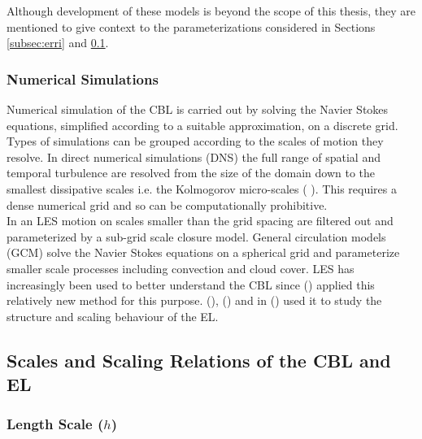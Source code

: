Although development of these models is beyond the scope of this thesis, they are mentioned to give context to the parameterizations considered in Sections \ref{subsec:erri} and \ref{subsec:scales}. \\         

\subsubsection{Numerical Simulations}
\label{subsec:}

Numerical simulation of the \acs{CBL} is carried out by solving the Navier Stokes equations, simplified according to a suitable approximation, on a discrete grid.  Types of simulations can be grouped according to the scales of motion they resolve.  In direct numerical simulations (\acs{DNS}) the full range of spatial and temporal turbulence are resolved from the size of the domain down to the smallest dissipative scales i.e. the Kolmogorov micro-scales (\citeauthor{Kolmog} \citeyear{Kolmog}).  This requires a dense numerical grid and so can be computationally prohibitive.\\

In an \acs{LES} motion on scales smaller than the grid spacing are filtered out and parameterized by a sub-grid scale closure model. General circulation models (\acs{GCM}) solve the Navier Stokes equations on a spherical grid and parameterize smaller scale processes including convection and cloud cover.  \acs{LES} has increasingly been used to better understand the \acs{CBL} since \citeauthor{Deardorff72} (\citeyear{Deardorff72}) applied this relatively new method for this purpose.  \citeauthor{SullMoengStev} (\citeyear{SullMoengStev}), \citeauthor{FedConzMir04} (\citeyear{FedConzMir04}) and \citeauthor{BrooksFowler2} in (\citeyear{BrooksFowler2}) used it to study the structure and scaling behaviour of the \acs{EL}.\\

\subsection{Scales and Scaling Relations of the \acs{CBL} and \acs{EL}}
\label{subsec:scales}

\subsubsection{Length Scale ($h$)}
\label{subsubsec:}

